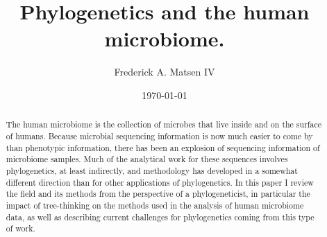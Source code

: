 \documentclass{amsart}
\newcommand{\forarxiv}[1]{#1}
\newcommand{\notforarxiv}[1]{}
\begin{document}
\notforarxiv{
\begin{flushright}
Version dated: \today
\end{flushright}
\bigskip
\noindent RH: PHYLOGENETICS AND THE HUMAN MICROBIOME
\bigskip
\medskip
\begin{center}

\noindent{\Large \bf Phylogenetics and the human microbiome.}
\bigskip

\noindent {\normalsize \sc
Frederick A. Matsen IV$^1$}\\
\noindent {\small \it
$^1$
Program in Computational Biology, Fred Hutchinson Cancer Research Center, Seattle, WA, 91802, USA}\\
\end{center}
\medskip
\noindent{\bf Corresponding author:} Frederick A Matsen, Program in Computational Biology, Fred Hutchinson Cancer Research Center, Seattle, WA, 91802, USA; E-mail: matsen@fhcrc.org.\\
\vspace{1in}
}

\forarxiv{\
\title{Phylogenetics and the human microbiome.}
\author{Frederick A. Matsen IV}
\date{\today}
\begin{abstract}
}
\notforarxiv{
\subsubsection{Abstract}
}

The human microbiome is the collection of microbes that live inside and on the surface of humans.
Because microbial sequencing information is now much easier to come by than phenotypic information, there has been an explosion of sequencing information of microbiome samples.
Much of the analytical work for these sequences involves phylogenetics, at least indirectly, and methodology has developed in a somewhat different direction than for other applications of phylogenetics.
In this paper I review the field and its methods from the perspective of a phylogeneticist, in particular the impact of tree-thinking on the methods used in the analysis of human microbiome data, as well as describing current challenges for phylogenetics coming from this type of work.

\forarxiv{
\end{abstract}
\maketitle
}

\notforarxiv{
\noindent (Keywords: human microbiome; microbial ecology; phylogenetic methods; review)\\
\vspace{1.5in}
}
\end{document}
